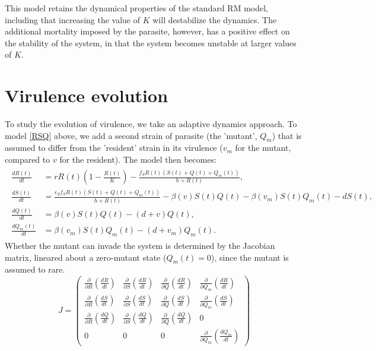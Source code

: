 \documentclass[12pt,reqno,final,pdftex]{amsart}\usepackage[]{graphicx}\usepackage[]{color}
\theoremstyle{plain}
\numberwithin{equation}{part}
\begin{document}
This model retains the dynamical properties of the standard RM model, including that increasing the value of $K$ will destabilize the dynamics.
The additional mortality imposed by the parasite, however, has a positive effect on the stability of the system, in that the system becomes unstable at larger values of $K$.

\section*{Virulence evolution}
To study the evolution of virulence, we take an adaptive dynamics approach.
To model \ref{RSQ} above, we add a second strain of parasite (the 'mutant', $Q_m$)  that is assumed to differ from the 'resident' strain in its virulence ($v_m$ for the mutant, compared to $v$ for the resident).
The model then becomes:
\begin{align}\label{RSQQm}
\begin{split}
\frac{dR(t)}{dt} &= r R(t) \left(1 - \frac{R(t)}{K}\right) - \frac{f_S R(t) (S(t)+Q(t)+Q_m(t))}{h + R(t)}, \\
\frac{dS(t)}{dt} &= \frac{\epsilon_S f_S R(t) (S(t)+Q(t)+Q_m(t))}{h + R(t)} - \beta(v) S(t) Q(t) - \beta(v_m) S(t) Q_m(t)- d S(t), \\
\frac{dQ(t)}{dt} &= \beta(v) S(t) Q(t) - (d + v)Q(t), \\
\frac{dQ_m(t)}{dt} &= \beta(v_m) S(t) Q_m(t) - (d + v_m)Q_m(t).
\end{split}
\end{align}
Whether the mutant can invade the system is determined by the Jacobian matrix, lineared about a zero-mutant state ($Q_m(t) = 0$), since the mutant is assumed to rare.
\begin{equation}
J = \begin{pmatrix}
\frac{\partial}{\partial R}\left(\frac{dR}{dt}\right) & \frac{\partial}{\partial S}\left(\frac{dR}{dt}\right) & \frac{\partial}{\partial Q}\left(\frac{dR}{dt}\right) & \frac{\partial}{\partial Q_m}\left(\frac{dR}{dt}\right) \\
\frac{\partial}{\partial R}\left(\frac{dS}{dt}\right) & \frac{\partial}{\partial S}\left(\frac{dS}{dt}\right) & \frac{\partial}{\partial Q}\left(\frac{dS}{dt}\right) & \frac{\partial}{\partial Q_m}\left(\frac{dS}{dt}\right) \\
\frac{\partial}{\partial R}\left(\frac{dQ}{dt}\right) & \frac{\partial}{\partial S}\left(\frac{dQ}{dt}\right) & \frac{\partial}{\partial Q}\left(\frac{dQ}{dt}\right) & 0 \\
0 & 0 & 0 & \frac{\partial}{\partial Q_m}\left(\frac{dQ_m}{dt}\right)
\end{pmatrix}
\end{equation}
\end{document}
